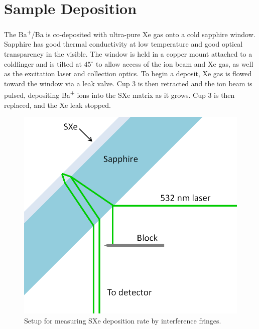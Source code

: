 
\section{Sample Deposition}
\label{sec:deposition}

The Ba\textsuperscript{+}/Ba is co-deposited with ultra-pure Xe gas onto a cold sapphire window.  Sapphire has good thermal conductivity at low temperature and good optical transparency in the visible.  The window is held in a copper mount attached to a coldfinger and is tilted at 45$^{\circ}$ to allow access of the ion beam and Xe gas, as well as the excitation laser and collection optics.  To begin a deposit, Xe gas is flowed toward the window via a leak valve.  Cup 3 is then retracted and the ion beam is pulsed, depositing Ba\textsuperscript{+} ions into the SXe matrix as it grows.  Cup 3 is then replaced, and the Xe leak stopped.

\begin{figure} %
        \centering
                \includegraphics[width=.4\textwidth]{figures/fringe_setup.png}
                \caption{Setup for measuring SXe deposition rate by interference fringes.}
\label{fig:fringe_setup}
\end{figure}

